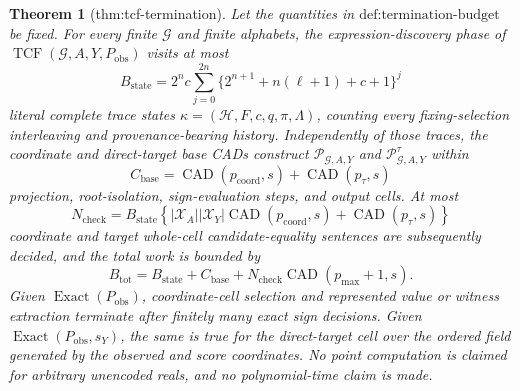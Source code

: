 \documentclass{article}
\newtheorem{theorem}{Theorem}
\begin{document}
\begin{theorem}[thm:tcf-termination]\label{thm:tcf-termination}
Let the quantities in \(\text{def:termination-budget}\) be fixed. For every finite \(\mathcal G\) and finite alphabets, the expression-discovery phase of \(\operatorname{TCF}(\mathcal G,A,Y,P_{\mathrm{obs}})\) visits at most
\[
B_{\mathrm{state}}=2^n c\sum_{j=0}^{2n}
\bigl\{2^{n+1}+n(\ell+1)+c+1\bigr\}^j
\]
literal complete trace states \(\kappa=(\mathcal H,F,c,q,\pi,\Lambda)\), counting every fixing-selection interleaving and provenance-bearing history. Independently of those traces, the coordinate and direct-target base CADs construct \(\mathscr P_{\mathcal G,A,Y}\) and \(\mathscr P^{\tau}_{\mathcal G,A,Y}\) within
\[
C_{\mathrm{base}}
=\operatorname{CAD}(p_{\mathrm{coord}},s)
+\operatorname{CAD}(p_{\tau},s)
\]
projection, root-isolation, sign-evaluation steps, and output cells. At most
\[
N_{\mathrm{check}}
=B_{\mathrm{state}}
\left\{|\mathcal X_A||\mathcal X_Y|
\operatorname{CAD}(p_{\mathrm{coord}},s)
+\operatorname{CAD}(p_{\tau},s)\right\}
\]
coordinate and target whole-cell candidate-equality sentences are subsequently decided, and the total work is bounded by
\[
B_{\mathrm{tot}}
=B_{\mathrm{state}}+C_{\mathrm{base}}
+N_{\mathrm{check}}\operatorname{CAD}(p_{\max}+1,s).
\]
Given \(\operatorname{Exact}(P_{\mathrm{obs}})\), coordinate-cell selection and represented value or witness extraction terminate after finitely many exact sign decisions. Given \(\operatorname{Exact}(P_{\mathrm{obs}},s_Y)\), the same is true for the direct-target cell over the ordered field generated by the observed and score coordinates. No point computation is claimed for arbitrary unencoded reals, and no polynomial-time claim is made.
\end{theorem}
\end{document}

